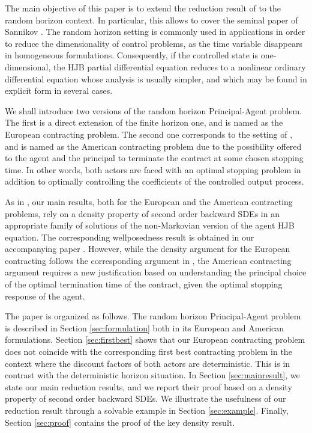 \documentclass[11pt,a4paper]{article}
\numberwithin{equation}{section}
\theoremstyle{definition}
\begin{document}
The main objective of this paper is to extend the reduction result of \cite{CPT18} to the random horizon context. In particular, this allows to cover the seminal paper of Sannikov \cite{Sannikov08}. The random horizon setting is commonly used in applications in order to reduce the dimensionality of control problems, as the time variable disappears in homogeneous formulations. Consequently, if the controlled state is one-dimensional, the HJB partial differential equation reduces to a nonlinear ordinary differential equation whose analysis is usually simpler, and which may be found in explicit form in several cases. 

We shall introduce two versions of the random horizon Principal-Agent problem. The first is a direct extension of the finite horizon one, and is named as the European contracting problem. The second one corresponds to the setting of \cite{Sannikov08}, and is named as the American contracting problem due to the possibility offered to the agent and the principal to terminate the contract at some chosen stopping time. In other words, both actors are faced with an optimal stopping problem in addition to optimally controlling the coefficients of the controlled output process.

As in \cite{CPT18}, our main results, both for the European and the American contracting problems, rely on a density property of second order backward SDEs in an appropriate family of solutions of the non-Markovian version of the agent HJB equation. The corresponding wellposedness result is obtained in our accompanying paper \cite{LRTY18}. However, while the density argument for the European contracting follows the corresponding argument in \cite{CPT18}, the American contracting argument requires a new justification based on understanding the principal choice of the optimal termination time of the contract, given the optimal stopping response of the agent.

The paper is organized as follows. The random horizon Principal-Agent problem is described in Section \ref{sec:formulation} both in its European and American formulations. Section \ref{sec:firstbest} shows that our European contracting problem does not coincide with the corresponding first best contracting problem in the context where the discount factors of both actors are deterministic. This is in contrast with the deterministic horizon situation. In Section \ref{sec:mainresult}, we state our main reduction results, and we report their proof based on a density property of second order backward SDEs. We illustrate the usefulness of our reduction result through a solvable example in Section \ref{sec:example}. Finally, Section \ref{sec:proof} contains the proof of the key density result.
\end{document}
